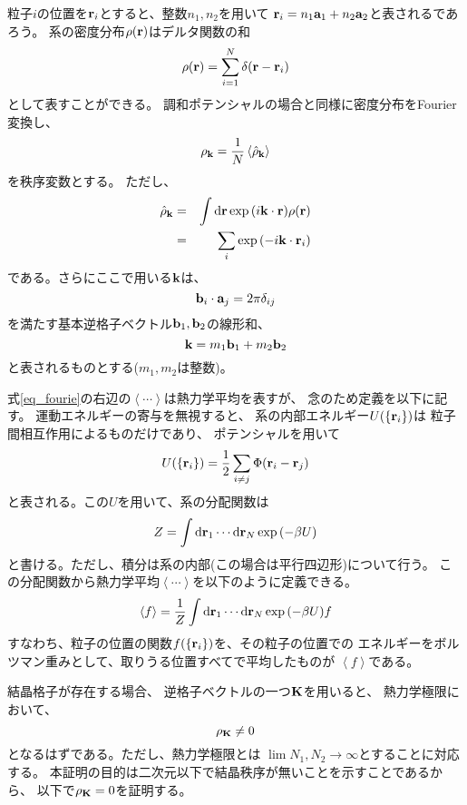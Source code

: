 \documentclass{jarticle}
\renewcommand{\v}[1]{{\bf #1}}
\newcommand{\ave}[1]{\left< #1 \right>}
\begin{document}
粒子$i$の位置を$\v{r}_i$とすると、整数$n_1,n_2$を用いて
$\v{r}_i = n_1 \v{a}_1 + n_2 \v{a}_2$と表されるであろう。
系の密度分布$\rho(\v{r})$はデルタ関数の和
$$
  \rho(\v{r}) = \sum_{i=1}^{N} \delta(\v{r} - \v{r}_i)
$$
として表すことができる。
調和ポテンシャルの場合と同様に密度分布をFourier変換し、
\begin{equation}
  \rho_{\v{k}} = \frac{1}{N} \ave{\hat{\rho}_{\v{k}}}
  \label{eq_fourie}
\end{equation}
を秩序変数とする。
ただし、
\begin{eqnarray}
  \hat{\rho}_{\v{k}} &=& \int \mbox{d} \v{r} \exp{(i \v{k} \cdot \v{r})} \rho(\v{r})\\
  &=& \sum_i \exp{(-i \v{k} \cdot \v{r}_i)}
\end{eqnarray}
である。さらにここで用いる$\v{k}$は、
\begin{equation}
  \v{b}_i \cdot \v{a}_j = 2\pi \delta_{ij}
\end{equation}
を満たす基本逆格子ベクトル$\v{b}_1, \v{b}_2$の線形和、
\begin{equation}
  \v{k} = m_1 \v{b}_1 + m_2 \v{b}_2
\end{equation}
と表されるものとする($m_1,m_2$は整数)。

式\ref{eq_fourie}の右辺の$\ave{\cdots}$は熱力学平均を表すが、
念のため定義を以下に記す。
運動エネルギーの寄与を無視すると、
系の内部エネルギー$U(\{ \v{r}_i \})$は
粒子間相互作用によるものだけであり、
ポテンシャルを用いて
\begin{equation}
  U(\{ \v{r}_i \}) = \frac{1}{2} \sum_{i \neq j} \Phi(\v{r}_i - \v{r}_j)
\end{equation}
と表される。この$U$を用いて、系の分配関数は
\begin{equation}
  Z = \int \mbox{d} \v{r}_1 \cdots \mbox{d}\v{r}_N
  \exp{(-\beta U)}
\end{equation}
と書ける。ただし、積分は系の内部(この場合は平行四辺形)について行う。
この分配関数から熱力学平均$\ave{\cdots}$を以下のように定義できる。
\begin{equation}
  \ave{f} = \frac{1}{Z} \int \mbox{d} \v{r}_1 \cdots \mbox{d}\v{r}_N
  \exp{(-\beta U)} f
\end{equation}
すなわち、粒子の位置の関数$f(\{ \v{r}_i \})$を、その粒子の位置での
エネルギーをボルツマン重みとして、取りうる位置すべてで平均したものが
$\ave{f}$である。

結晶格子が存在する場合、
逆格子ベクトルの一つ$\v{K}$を用いると、
熱力学極限において、
\begin{equation}
  \rho_{\v{K}} \neq 0
\end{equation}
となるはずである。ただし、熱力学極限とは
$\lim N_1, N_2 \rightarrow \infty$とすることに対応する。
本証明の目的は二次元以下で結晶秩序が無いことを示すことであるから、
以下で$\rho_{\v{K}} = 0$を証明する。
\end{document}
